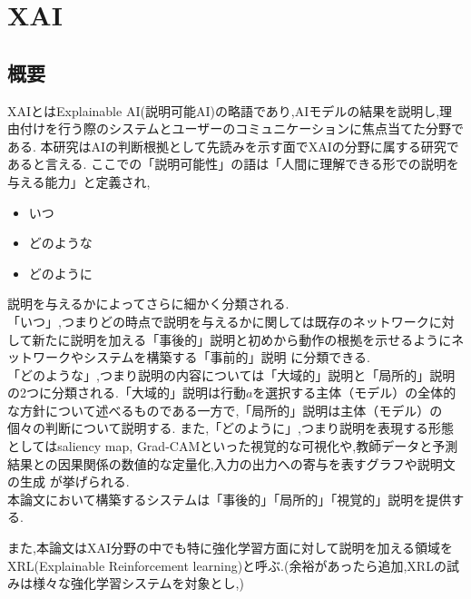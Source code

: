 \section{XAI}

\subsection{概要}
XAIとはExplainable AI(説明可能AI)の略語であり,AIモデルの結果を説明し,理由付けを行う際のシステムとユーザーのコミュニケーションに焦点当てた分野である\cite{consider}.
本研究はAIの判断根拠として先読みを示す面でXAIの分野に属する研究であると言える.
ここでの「説明可能性」の語は「人間に理解できる形での説明を与える能力」\cite{definition}と定義され,
\begin{itemize}
    \item いつ
    \item どのような
    \item どのように
\end{itemize}
説明を与えるかによってさらに細かく分類される.\\
「いつ」,つまりどの時点で説明を与えるかに関しては既存のネットワークに対して新たに説明を加える「事後的」説明と初めから動作の根拠を示せるようにネットワークやシステムを構築する「事前的」説明
に分類できる\cite{definition}.\\
「どのような」,つまり説明の内容については「大域的」説明と「局所的」説明の2つに分類される.「大域的」説明は行動$a$を選択する主体（モデル）の全体的な方針について述べるものである一方で,「局所的」説明は主体（モデル）の個々の判断について説明する\cite{gl}.
また,「どのように」,つまり説明を表現する形態としてはsaliency map\cite{saliency}, Grad-CAM\cite{Grad-CAM}といった視覚的な可視化や,教師データと予測結果との因果関係の数値的な定量化\cite{定量},入力の出力への寄与を表すグラフや説明文の生成\cite{LIME}
が挙げられる.\\
本論文において構築するシステムは「事後的」「局所的」「視覚的」説明を提供する.

また,本論文はXAI分野の中でも特に強化学習方面に対して説明を加える領域をXRL(Explainable Reinforcement learning)と呼ぶ.(余裕があったら追加,XRLの試みは様々な強化学習システムを対象とし,)
